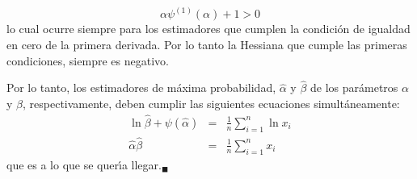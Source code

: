 \begin{solucion}
\begin{enumerate}
  \begin{equation*}
   \alpha\psi^{(1)}(\alpha) + 1 > 0
  \end{equation*}
  lo cual ocurre siempre para los estimadores que cumplen la condici\'on de igualdad en cero de la primera derivada. Por lo tanto la Hessiana que cumple las primeras condiciones, siempre es negativo.
  \par 
  Por lo tanto, los estimadores de m\'axima probabilidad, $\widehat{\alpha}$ y $\widehat{\beta}$ de los par\'ametros $\alpha$ y $\beta$, respectivamente, deben cumplir las siguientes ecuaciones simult\'aneamente:
  \begin{eqnarray*}
   \ln \widehat{\beta} + \psi\left(\widehat{\alpha}\right) & = & \frac{1}{n} \sum_{i=1}^{n} \ln x_i \\
   \widehat{\alpha}\widehat{\beta} & = & \frac{1}{n}\sum_{i=1}^n x_i
  \end{eqnarray*}
  que es a lo que se quer\'{\i}a llegar.${}_{\blacksquare}$
 \end{enumerate}
\end{solucion}

